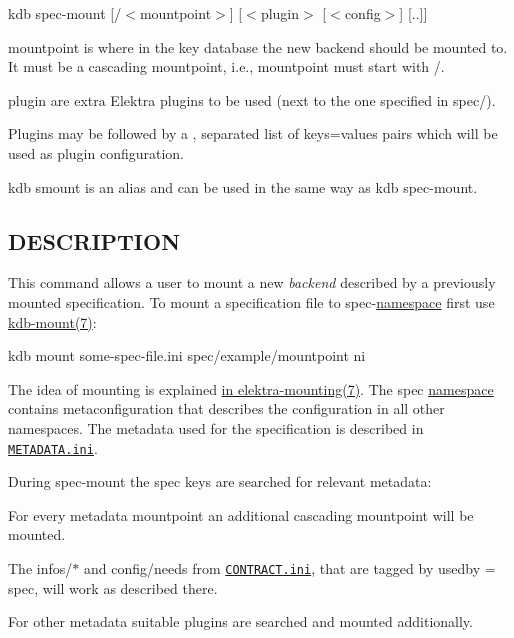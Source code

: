 {\ttfamily kdb spec-\/mount \mbox{[}/$<$mountpoint$>$\mbox{]} \mbox{[}$<$plugin$>$ \mbox{[}$<$config$>$\mbox{]} \mbox{[}..\mbox{]}\mbox{]}}


\begin{DoxyItemize}
\item {\ttfamily mountpoint} is where in the key database the new backend should be mounted to. It must be a cascading mountpoint, i.\+e., {\ttfamily mountpoint} must start with {\ttfamily /}.
\item {\ttfamily plugin} are extra Elektra plugins to be used (next to the one specified in {\ttfamily spec/}).
\item Plugins may be followed by a {\ttfamily ,} separated list of {\ttfamily keys=values} pairs which will be used as plugin configuration.
\end{DoxyItemize}

{\ttfamily kdb smount} is an alias and can be used in the same way as {\ttfamily kdb spec-\/mount}.

\subsection*{D\+E\+S\+C\+R\+I\+P\+T\+I\+ON}

This command allows a user to mount a new {\itshape backend} described by a previously mounted specification. To mount a specification file to {\ttfamily spec}-\/\hyperlink{md_doc_help_elektra-namespaces_doc_help_elektra-namespaces_md}{namespace} first use \hyperlink{md_doc_help_kdb-mount_doc_help_kdb-mount_md}{kdb-\/mount(7)}\+: \begin{DoxyVerb}    kdb mount some-spec-file.ini spec/example/mountpoint ni
\end{DoxyVerb}


The idea of mounting is explained \hyperlink{md_doc_help_elektra-mounting_doc_help_elektra-mounting_md}{in elektra-\/mounting(7)}. The {\ttfamily spec} \hyperlink{md_doc_help_elektra-namespaces_doc_help_elektra-namespaces_md}{namespace} contains metaconfiguration that describes the configuration in all other namespaces. The metadata used for the specification is described in \href{/home/markus/Projekte/Elektra/current/doc/METADATA.ini}{\tt M\+E\+T\+A\+D\+A\+T\+A.\+ini}.

During {\ttfamily spec-\/mount} the {\ttfamily spec} keys are searched for relevant metadata\+:


\begin{DoxyItemize}
\item For every metadata {\ttfamily mountpoint} an additional cascading mountpoint will be mounted.
\item The {\ttfamily infos/$\ast$} and {\ttfamily config/needs} from \href{/home/markus/Projekte/Elektra/current/doc/CONTRACT.ini}{\tt C\+O\+N\+T\+R\+A\+C\+T.\+ini}, that are tagged by {\ttfamily usedby = spec}, will work as described there.
\item For other metadata suitable plugins are searched and mounted additionally.
\end{DoxyItemize}

